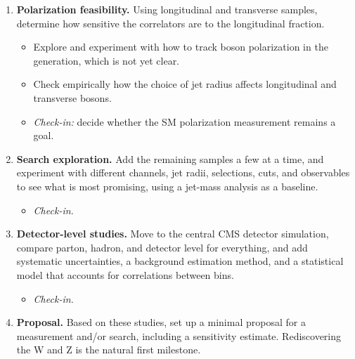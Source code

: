 \documentclass[11pt]{article}
\begin{document}
\begin{enumerate}
    \begin{itemize}
        \item Survey which of the samples in Table~\ref{tab:samples} are already available centrally, and use them when possible.
        \item We will probably need to skim a custom NANO format from MiniAOD to get at the jet constituents. Check whether everything we need is in MiniAOD, or if we need full AOD.
        \item \emph{Check-in.}
    \end{itemize}
    \item \textbf{Polarization feasibility.} Using longitudinal and transverse samples, determine how sensitive the correlators are to the longitudinal fraction.
    \begin{itemize}
        \item Explore and experiment with how to track boson polarization in the generation, which is not yet clear.
        \item Check empirically how the choice of jet radius affects longitudinal and transverse bosons.
        \item \emph{Check-in:} decide whether the SM polarization measurement remains a goal.
    \end{itemize}
    \item \textbf{Search exploration.} Add the remaining samples a few at a time, and experiment with different channels, jet radii, selections, cuts, and observables to see what is most promising, using a jet-mass analysis as a baseline.
    \begin{itemize}
        \item \emph{Check-in.}
    \end{itemize}
    \item \textbf{Detector-level studies.} Move to the central CMS detector simulation, compare parton, hadron, and detector level for everything, and add systematic uncertainties, a background estimation method, and a statistical model that accounts for correlations between bins.
    \begin{itemize}
        \item \emph{Check-in.}
    \end{itemize}
    \item \textbf{Proposal.} Based on these studies, set up a minimal proposal for a measurement and/or search, including a sensitivity estimate. Rediscovering the W and Z is the natural first milestone.
\end{enumerate}
\end{document}
